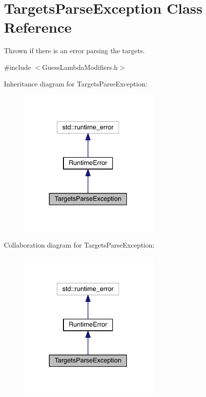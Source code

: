 \hypertarget{class_targets_parse_exception}{}\section{Targets\+Parse\+Exception Class Reference}
\label{class_targets_parse_exception}


Thrown if there is an error parsing the targets.  




{\ttfamily \#include $<$Guess\+Lambda\+Modifiers.\+h$>$}



Inheritance diagram for Targets\+Parse\+Exception\+:
\nopagebreak
\begin{figure}[H]
\begin{center}
\leavevmode
\includegraphics[width=199pt]{d9/dbd/class_targets_parse_exception__inherit__graph}
\end{center}
\end{figure}


Collaboration diagram for Targets\+Parse\+Exception\+:
\nopagebreak
\begin{figure}[H]
\begin{center}
\leavevmode
\includegraphics[width=199pt]{d5/d4f/class_targets_parse_exception__coll__graph}
\end{center}
\end{figure}
